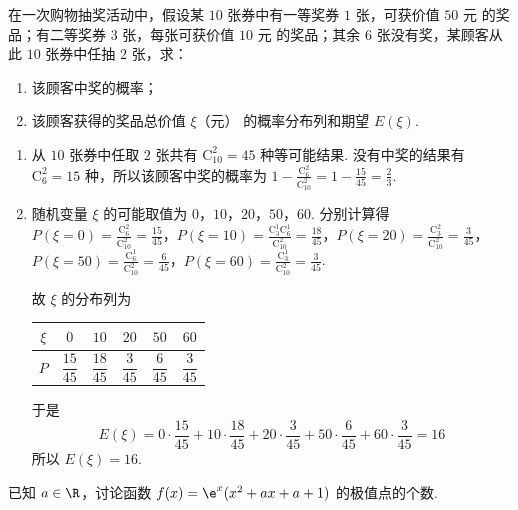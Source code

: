 \begin{problem}
在一次购物抽奖活动中，假设某 \(10\) 张券中有一等奖券 \(1\) 张，可获价值 \(50\text{ 元}\) 的奖品；有二等奖券 \(3\) 张，每张可获价值 \(10\text{ 元}\) 的奖品；其余 \(6\) 张没有奖，某顾客从此 \(10\) 张券中任抽 \(2\) 张，求：

\begin{enumerate}
\item 该顾客中奖的概率；
\item 该顾客获得的奖品总价值 \(\xi\text{（元）}\) 的概率分布列和期望 \(E(\xi)\).
\end{enumerate}
\end{problem}

\begin{solution}
\begin{enumerate}
\item
从 \(10\) 张券中任取 \(2\) 张共有 \(\mathrm C_{10}^{2}=45\) 种等可能结果. 没有中奖的结果有 \(\mathrm C_{6}^{2}=15\) 种，所以该顾客中奖的概率为 \(1-\frac{\mathrm C_{6}^{2}}{\mathrm C_{10}^{2}}=1-\frac{15}{45}=\frac{2}{3}\).

\item
随机变量 \(\xi\) 的可能取值为 \(0\)，\(10\)，\(20\)，\(50\)，\(60\). 分别计算得 \(P(\xi=0)=\frac{\mathrm C_{6}^{2}}{\mathrm C_{10}^{2}}=\frac{15}{45}\)，\(P(\xi=10)=\frac{\mathrm C_{3}^{1}\mathrm C_{6}^{1}}{\mathrm C_{10}^{2}}=\frac{18}{45}\)，\(P(\xi=20)=\frac{\mathrm C_{3}^{2}}{\mathrm C_{10}^{2}}=\frac{3}{45}\)，\(P(\xi=50)=\frac{\mathrm C_{6}^{1}}{\mathrm C_{10}^{2}}=\frac{6}{45}\)，\(P(\xi=60)=\frac{\mathrm C_{3}^{1}}{\mathrm C_{10}^{2}}=\frac{3}{45}\).

故 \(\xi\) 的分布列为
\begin{center}
\begin{tabular}{c|ccccc}
\(\xi\) & \(0\) & \(10\) & \(20\) & \(50\) & \(60\) \\
\hline
\(P\) & \(\dfrac{15}{45}\) & \(\dfrac{18}{45}\) & \(\dfrac{3}{45}\) & \(\dfrac{6}{45}\) & \(\dfrac{3}{45}\)
\end{tabular}
\end{center}
于是
\[
E(\xi)=0\cdot\frac{15}{45}+10\cdot\frac{18}{45}+20\cdot\frac{3}{45}+50\cdot\frac{6}{45}+60\cdot\frac{3}{45}=16
\]
所以 \(E(\xi)=16\).
\end{enumerate}
\end{solution}

\begin{problem}
已知 \(a \in \R\)，讨论函数 \(f(x) = \e^{x}(x^{2} + ax + a + 1)\) 的极值点的个数.
\end{problem}

